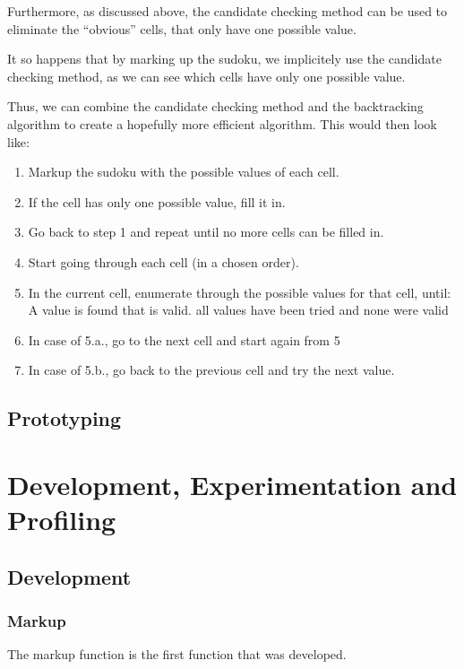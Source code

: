 \documentclass[12pt]{report} %
\begin{document}
Furthermore, as discussed above, the candidate checking method can be used to eliminate the ``obvious'' cells, that only have one possible value.

It so happens that by marking up the sudoku, we implicitely use the candidate checking method, as we can see which cells have only one possible value.

Thus, we can combine the candidate checking method and the backtracking algorithm to create a hopefully more efficient algorithm. This would then look like:

\begin{enumerate}
  \item Markup the sudoku with the possible values of each cell.
  \item If the cell has only one possible value, fill it in.
  \item Go back to step 1 and repeat until no more cells can be filled in.
  \item Start going through each cell (in a chosen order).
  \item In the current cell, enumerate through the possible values for that cell, until:
   A value is found that is valid.
   all values have been tried and none were valid
  \item In case of 5.a., go to the next cell and start again from 5
  \item In case of 5.b., go back to the previous cell and try the next value.
\end{enumerate}


\section{Prototyping}




\chapter{Development, Experimentation and Profiling}

\section{Development}

\subsection{Markup}
The markup function is the first function that was developed.
\end{document}
